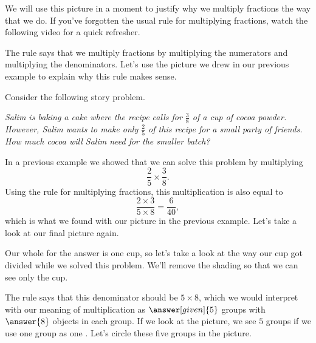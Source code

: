 \documentclass{ximera}
\begin{document}
\begin{example}
\end{example}

We will use this picture in a moment to justify why we multiply fractions the way that we do. If you've forgotten the usual rule for multiplying fractions, watch the following video for a quick refresher.


The rule says that we multiply fractions by multiplying the numerators and multiplying the denominators. Let's use the picture we drew in our previous example to explain why this rule makes sense.

\begin{example}
Consider the following story problem. 

\emph{Salim is baking a cake where the recipe calls for $\frac{3}{8}$ of a cup of cocoa powder. However, Salim wants to make only $\frac{2}{5}$ of this recipe for a small party of friends. How much cocoa will Salim need for the smaller batch?}

In a previous example we showed that we can solve this problem by multiplying
\[
\frac{2}{5} \times \frac{3}{8}.
\]
Using the rule for multiplying fractions, this multiplication is also equal to 
\[
\frac{2\times 3}{5 \times 8} = \frac{6}{40},
\]
which is what we found with our picture in the previous example. Let's take a look at our final picture again.
\begin{image}
\end{image}
Our whole for the answer is one cup, so let's take a look at the way our cup got divided while we solved this problem. We'll remove the shading so that we can see only the cup. 
\begin{image}
\end{image}
The rule says that this denominator should be $5 \times 8$, which we would interpret with our meaning of multiplication as $\answer[given]{5}$ groups with $\answer{8}$ objects in each group. If we look at the picture, we see $5$ groups if we use one group as one . Let's circle these five groups in the picture.


\end{example}
\end{document}
